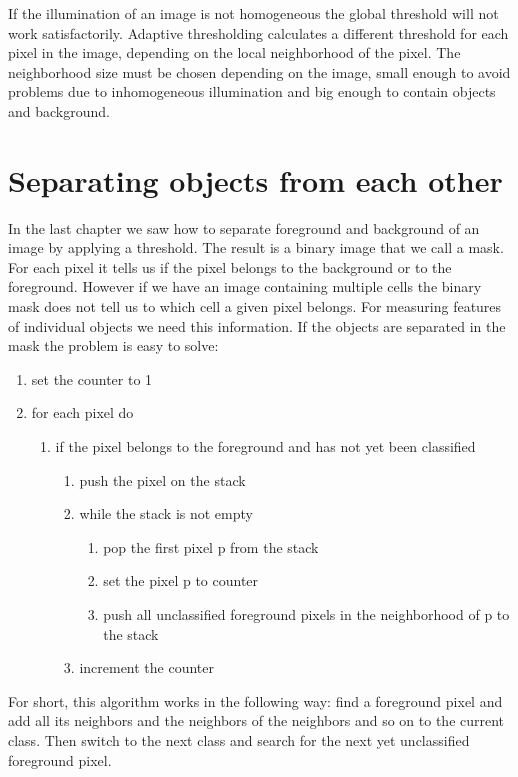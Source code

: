 If the illumination of an image is not homogeneous the global threshold will not work satisfactorily. Adaptive thresholding calculates a different threshold for each pixel in the image, depending on the local neighborhood of the pixel. The neighborhood size must be chosen depending on the image, small enough to avoid problems due to inhomogeneous illumination and big enough to contain objects and background.

\section{Separating objects from each other}

In the last chapter we saw how to separate foreground and background of an image by applying a threshold. The result is a binary image that we call a mask. For each pixel it tells us if the pixel belongs to the background or to the foreground. However if we have an image containing multiple cells the binary mask does not tell us to which cell a given pixel belongs. For measuring features of individual objects we need this information. If the objects are separated in the mask the problem is easy to solve:

\begin{enumerate}
\item set the counter to 1
\item for each pixel do
\begin{enumerate}
\item if the pixel belongs to the foreground and has not yet been classified
\begin{enumerate}
\item push the pixel on the stack
\item while the stack is not empty
\begin{enumerate}
\item pop the first pixel p from the stack
\item set the pixel p to counter
\item push all unclassified foreground pixels in the neighborhood of p to the stack
\end{enumerate}
\item increment the counter
\end{enumerate}
\end{enumerate}
\end{enumerate}

For short, this algorithm works in the following way: find a foreground pixel and add all its neighbors and the neighbors of the neighbors and so on to the current class. Then switch to the next class and search for the next yet unclassified foreground pixel.


